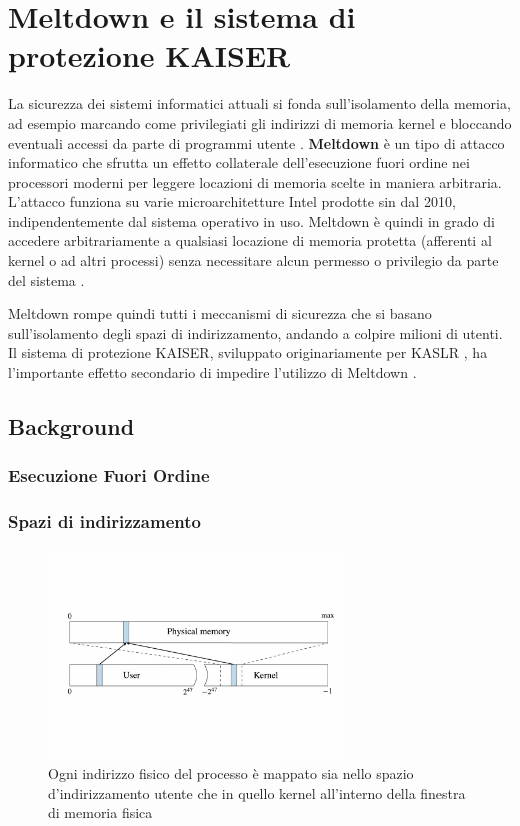 \chapter{Meltdown e il sistema di protezione KAISER}
La sicurezza dei sistemi informatici attuali si fonda sull'isolamento della memoria,
ad esempio marcando come privilegiati gli indirizzi di memoria kernel e bloccando eventuali
accessi da parte di programmi utente \cite{lettieri:protezione}. 
\textbf{Meltdown} è un tipo di attacco informatico che sfrutta un effetto
collaterale dell'esecuzione fuori ordine nei processori moderni per leggere locazioni di memoria scelte in maniera
arbitraria. L'attacco funziona su varie microarchitetture Intel prodotte sin dal 2010, indipendentemente dal sistema
operativo in uso. Meltdown è quindi in grado di accedere arbitrariamente a qualsiasi locazione di memoria protetta
(afferenti al kernel o ad altri processi) senza necessitare alcun permesso o privilegio da parte del
sistema \cite{lipp:meltdown}.

Meltdown rompe quindi tutti i meccanismi di sicurezza che si basano sull'isolamento degli spazi di indirizzamento, andando a colpire milioni di utenti. Il sistema di protezione KAISER, sviluppato originariamente per KASLR \cite{gruss:kaslr}, ha l'importante effetto secondario di impedire l'utilizzo di Meltdown \cite{lipp:meltdown}.


\section{Background}

\subsection{Esecuzione Fuori Ordine}
\label{sec:esecuzione-fuori-ordine}

\subsection{Spazi di indirizzamento}
\label{sec:spazi-di-indirizzamento}
\begin{figure}
	\centering
	\includegraphics[width=0.7\textwidth]{"img/memoria-fisica.pdf"}
	\caption{Ogni indirizzo fisico del processo è mappato sia nello spazio d'indirizzamento utente che in quello kernel all'interno della finestra di memoria fisica}
	\label{fig:memoria-fisica}
\end{figure}


